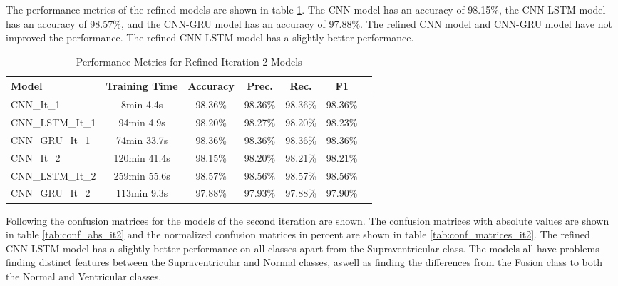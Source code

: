 The performance metrics of the refined models are shown in table \ref{tab:eval_metrics_it2}. The CNN model has an accuracy of 98.15\%, the CNN-LSTM model has an accuracy of 98.57\%, and the CNN-GRU model has an accuracy of 97.88\%. The refined CNN model and CNN-GRU model have not improved the performance. The refined CNN-LSTM model has a slightly better performance. 

\begin{table}[hbt]
    \centering
    \caption{Performance Metrics for Refined Iteration 2 Models}
    \label{tab:eval_metrics_it2}
    \begin{tabular}{lcccccc}
        \toprule
        \textbf{Model} & \textbf{Training Time} & \textbf{Accuracy} & \textbf{Prec.} & \textbf{Rec.} & \textbf{F1} \\
        \midrule
        CNN\_It\_1     & 8min 4.4s  & 98.36\% & 98.36\% & 98.36\% & 98.36\% \\
        CNN\_LSTM\_It\_1 & 94min 4.9s & 98.20\% & 98.27\% & 98.20\% & 98.23\% \\
        CNN\_GRU\_It\_1  & 74min 33.7s & 98.36\% & 98.36\% & 98.36\% & 98.36\% \\

        CNN\_It\_2      & 120min 41.4s & 98.15\% & 98.20\% & 98.21\% & 98.21\% \\
        CNN\_LSTM\_It\_2 & 259min 55.6s & 98.57\% & 98.56\% & 98.57\% & 98.56\% \\
        CNN\_GRU\_It\_2  & 113min 9.3s & 97.88\% & 97.93\% & 97.88\% & 97.90\% \\
        \bottomrule
    \end{tabular}
\end{table}

Following the confusion matrices for the models of the second iteration are shown. The confusion matrices with absolute values are shown in table \ref{tab:conf_abs_it2} and the normalized confusion matrices in percent are shown in table \ref{tab:conf_matrices_it2}. The refined CNN-LSTM model has a slightly better performance on all classes apart from the Supraventricular class. The models all have problems finding distinct features between the Supraventricular and Normal classes, aswell as finding the differences from the Fusion class to both the Normal and Ventricular classes. 

